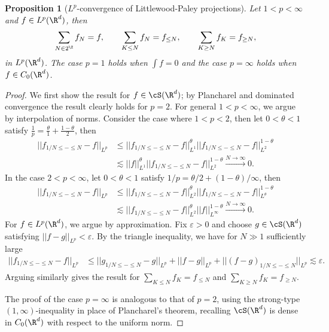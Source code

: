 \documentclass[reqno]{amsart}
\newtheorem{proposition}[theorem]{Proposition}
\theoremstyle{definition}
\theoremstyle{remark}
\renewcommand{\epsilon}{\varepsilon}
\begin{document}
\begin{proposition}[$L^p$-convergence of Littlewood-Paley projections]
	Let $1 < p < \infty$ and $f \in L^p (\R^d)$, then
		\[ \sum_{N \in 2^\Z} f_N  =  f, \qquad \sum_{K \leq N} f_N = f_{\leq N}, \qquad \sum_{K \geq N} f_K = f_{\geq N},  \]
	in $L^p (\R^d)$. The case $p = 1$ holds when $\int f = 0$ and the case $p = \infty$ holds when $f \in C_0 (\R^d)$. \label{prop:converge}
\end{proposition}

\begin{proof}
	We first show the result for $f \in \cS (\R^d)$; by Plancharel and dominated convergence the result clearly holds for $p = 2$. For general $1 < p < \infty$, we argue by interpolation of norms. Consider the case where $1 < p < 2$, then let $0 < \theta < 1$ satisfy $\tfrac1p = \tfrac{\theta}{1} + \tfrac{1 - \theta}{2}$, then 
				\begin{align*}
					 ||f_{1/N \leq - \leq N} - f||_{L^p} 
					 	&\leq ||f_{1/N \leq - \leq N} - f||_{L^1}^\theta ||f_{1/N \leq - \leq N} - f||_{L^2}^{1 - \theta}\\
					 	& \lesssim ||f||^\theta_{L^1}||f_{1/N \leq - \leq N} - f||_{L^2}^{1 - \theta} \overset{N \to \infty}{\longrightarrow} 0. 
				\end{align*}
			In the case $2 < p < \infty$, let $0 < \theta < 1$ satisfy $1/p = \theta/2 + (1 - \theta)/\infty$, then 
				\begin{align*}
					 ||f_{1/N \leq - \leq N} - f||_{L^p} 
					 	&\leq ||f_{1/N \leq - \leq N} - f||_{L^2}^\theta ||f_{1/N \leq - \leq N} - f||_{L^\theta}^{1 - \theta}\\
					 	& \lesssim ||f_{1/N \leq - \leq N} - f||_{L^2}^{\theta}   ||f||^{1 - \theta}_{L^\infty}\overset{N \to \infty}{\longrightarrow} 0. 
				\end{align*}	 
			For $f \in L^p (\R^d)$, we argue by approximation. Fix $\epsilon > 0$ and choose $g \in \cS (\R^d)$ satisfying $||f - g||_{L^p} < \epsilon$. By the triangle inequality, we have for $N \gg 1$ sufficiently large
				\begin{align*}
					||f_{1/N \leq - \leq N} - f ||_{L^p} 
						&\leq || g_{1/N \leq - \leq N} - g||_{L^p} + ||f - g||_{L^p} + ||(f - g)_{1/N \leq - \leq N}||_{L^p}\lesssim \epsilon.
				\end{align*}	
		Arguing similarly gives the result for $\sum_{K \leq N} f_K = f_{\leq N}$ and $\sum_{K \geq N} f_K = f_{\geq N}$. 	
	
		The proof of the case $p = \infty$ is analogous to that of $p = 2$, using the strong-type $(1, \infty)$-inequality in place of Plancharel's theorem, recalling $\cS (\R^d)$ is dense in $C_0 (\R^d)$ with respect to the uniform norm. 
		

\end{proof}
\end{document}
